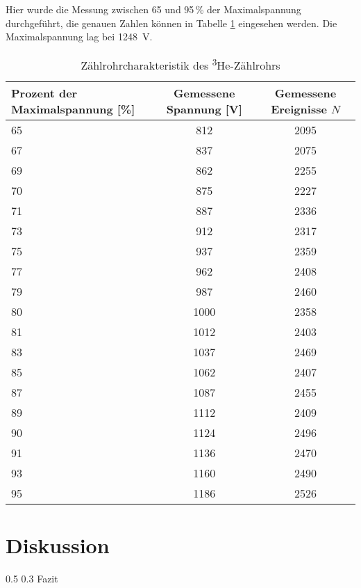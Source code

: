\documentclass[german, %
parskip=full, %
bibliography=totoc, %
]{scrartcl}
\makeatletter
\renewcommand\subsection{\@startsection 
   {subsection}{2}{0mm}%
   {0.5\baselineskip}%
   {0.3\baselineskip}%
   {\bfseries\sffamily\large}%
   }
\makeatother
\begin{document}
Hier wurde die Messung zwischen 65 und 95\,\% der Maximalspannung durchgeführt, die genauen Zahlen können in Tabelle \ref{tab:Prot1} eingesehen werden. Die Maximalspannung lag bei \SI{1248}{\volt}.
\begin{table}[ht]
\centering
\begin{tabular}[h]{l|c|c}
Prozent der Maximalspannung [\%] & Gemessene Spannung [V] & Gemessene Ereignisse $N$ \\ \hline
65 & 812 & 2095 \\ \hline
67 & 837 & 2075 \\ \hline
69 & 862 & 2255 \\ \hline
70 & 875 & 2227 \\ \hline
71 & 887 & 2336 \\ \hline
73 & 912 & 2317 \\ \hline
75 & 937 & 2359 \\ \hline
77 & 962 & 2408 \\ \hline
79 & 987 & 2460 \\ \hline
80 & 1000 & 2358 \\ \hline
81 & 1012 & 2403 \\ \hline
83 & 1037 & 2469 \\ \hline
85 & 1062 & 2407 \\ \hline
87 & 1087 & 2455 \\ \hline
89 & 1112 & 2409 \\ \hline
90 & 1124 & 2496 \\ \hline
91 & 1136 & 2470 \\ \hline
93 & 1160 & 2490 \\ \hline
95 & 1186 & 2526 \\ 
\end{tabular}
\caption{Zählrohrcharakteristik des \textsuperscript{3}He-Zählrohrs}
\label{tab:Prot1}
\end{table}


\section{Diskussion}

\subsection{Fazit}


\begin{thebibliography}{9}



\end{thebibliography}
\end{document}
